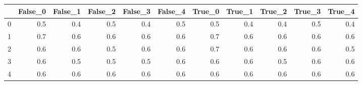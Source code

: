 \begin{tabular}{lrrrrrrrrrr}
\toprule
{} &  False\_0 &  False\_1 &  False\_2 &  False\_3 &  False\_4 &  True\_0 &  True\_1 &  True\_2 &  True\_3 &  True\_4 \\ \hline
\midrule
0 &      0.5 &      0.4 &      0.5 &      0.4 &      0.5 &     0.5 &     0.4 &     0.4 &     0.5 &     0.4 \\ \hline
1 &      0.7 &      0.6 &      0.6 &      0.6 &      0.6 &     0.7 &     0.6 &     0.6 &     0.6 &     0.6 \\ \hline
2 &      0.6 &      0.6 &      0.5 &      0.6 &      0.6 &     0.7 &     0.6 &     0.6 &     0.6 &     0.5 \\ \hline
3 &      0.6 &      0.5 &      0.5 &      0.5 &      0.6 &     0.6 &     0.6 &     0.5 &     0.6 &     0.6 \\ \hline
4 &      0.6 &      0.6 &      0.6 &      0.6 &      0.6 &     0.6 &     0.6 &     0.6 &     0.6 &     0.6 \\ \hline
\bottomrule
\end{tabular}
